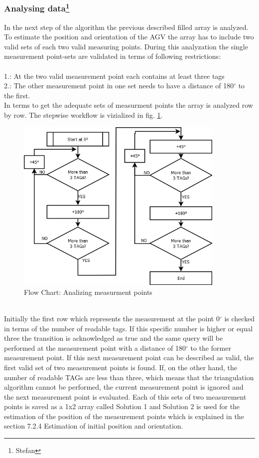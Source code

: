 \subsubsection[Analysing data]{Analysing data\footnote{Stefan}}
In the next step of the algorithm the previous described filled array is analyzed. To estimate the position and orientation of the AGV the array has to include two valid sets of each two valid measuring points.  During this analyzation the single measurement point-sets are validated in terms of following restrictions:\\\\
1.: At the two valid measurement point each contains at least three tags\\
2.: The other measurement point in one set needs to have a distance of 180$^\circ$  to the first.
\pagebreak\\
In terms to get the adequate sets of measurment points the array is analyzed row by row. The stepwise workflow is vizialized in fig. \ref{Analyze_Array}.\\
\begin{figure}[!htbp]
\centering
\includegraphics[width = 10cm]{Pictures/AnalyzeArray}
\caption{Flow Chart: Analizing measurment points}
\label{Analyze_Array}
\end{figure}\\
Initially the first row which represents the measurement at the point 0$^\circ$ is checked in terms of the number of readable tags. If this specific number is higher or equal three the transition is acknowledged as true and the same query will be performed at the measurement point with a distance of 180$^\circ$ to the former measurement point. If this next measurement point can be described as valid, the first valid set of two measurement points is found. If, on the other hand, the number of readable TAGs are less than three, which means that the triangulation algorithm cannot be performed, the current measurement point is ignored and the next measurement point is evaluated.
Each of this sets of two measurement points is saved as a 1x2 array called Solution 1 and Solution 2 is used for the estimation of the position of the measurement points which is explained in the section 7.2.4 Estimation of initial position and orientation.\\
%

